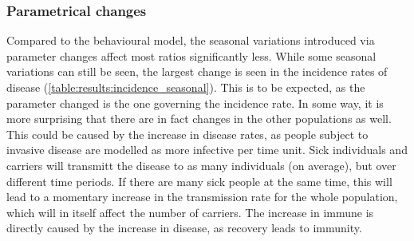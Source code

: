 \documentclass[10pt,a4paper]{article}
\begin{document}
\subsubsection{Parametrical changes}

Compared to the behavioural model, the seasonal variations introduced via parameter changes affect most ratios significantly less. While some seasonal variations can still be seen, the largest change is seen in the incidence rates of disease (\cref{table:results:incidence_seasonal}). This is to be expected, as the parameter changed is the one governing the incidence rate. In some way, it is more surprising that there are in fact changes in the other populations as well. This could be caused by the increase in disease rates, as people subject to invasive disease are modelled as more infective per time unit. Sick individuals and carriers will transmitt the disease to as many individuals (on average), but over different time periods. If there are many sick people at the same time, this will lead to a momentary increase in the transmission rate for the whole population, which will in itself affect the number of carriers. The increase in immune is directly caused by the increase in disease, as recovery leads to immunity.
\end{document}
